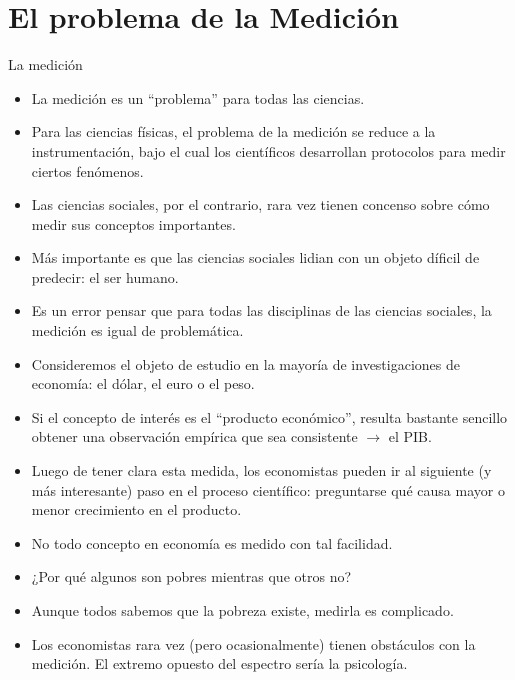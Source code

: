 \documentclass[xcolor=dvipsnames]{beamer}
\begin{document}
\section{El problema de la Medición}
\begin{frame}{La medición}
	\begin{itemize}
\justifying
\item La medición es un ``problema'' para todas las ciencias.
\item Para las ciencias físicas, el problema de la medición se reduce a la instrumentación, bajo el cual los científicos desarrollan protocolos para medir ciertos fenómenos.
\item Las ciencias sociales, por el contrario, rara vez tienen concenso sobre cómo medir sus conceptos importantes.
\item Más importante es que las ciencias sociales lidian con un objeto díficil de predecir: el ser humano. 
\end{itemize}
\end{frame}

\begin{frame}
\begin{itemize}
\justifying
\item Es un error pensar que para todas las disciplinas de las ciencias sociales, la medición es igual de problemática.
\item Consideremos el objeto de estudio en la mayoría de investigaciones de economía: el dólar, el euro o el peso.
\item Si el concepto de interés es el ``producto económico'', resulta bastante sencillo obtener una observación empírica que sea consistente $ \rightarrow $ el PIB.
\item Luego de tener clara esta medida, los economistas pueden ir al siguiente (y más interesante) paso en el proceso científico: preguntarse qué causa 	mayor o menor crecimiento en el producto. \end{itemize}
\end{frame}

\begin{frame}
\begin{itemize}
\justifying
\item No todo concepto en economía es medido con tal facilidad.
\item ¿Por qué algunos son pobres mientras que otros no?
\item Aunque todos sabemos que la pobreza existe, medirla es complicado. 
\item Los economistas rara vez (pero ocasionalmente) tienen obstáculos con la medición. El extremo opuesto del espectro sería la psicología.
\end{itemize}
\end{frame}
\end{document}
